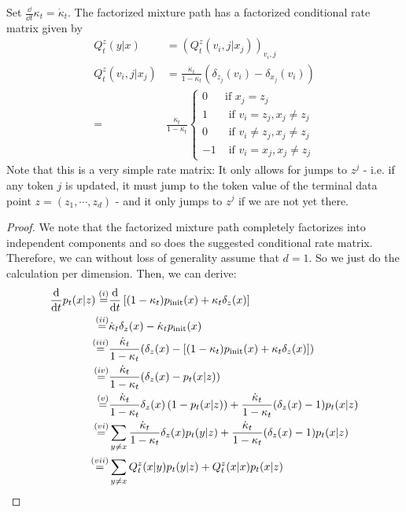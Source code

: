 \begin{examplebox}
\label{example:cond_rate_matrix_mixture_path}
Set $\frac{\dd}{\dd t}\kappa_t=\dot{\kappa}_t$. The factorized mixture path has a factorized conditional rate matrix given by
\begin{align*}
Q_t^z(y|x)&=(Q_t^z(v_i,j|x_j))_{v_i,j}\\
Q_t^z(v_i,j|x_j)&=\frac{\dot{\kappa}_t}{1-\kappa_t}(\delta_{z_j}(v_i)-\delta_{x_j}(v_i))\\
=&\frac{\dot{\kappa}_t}{1-\kappa_t}\begin{cases}
    0 & \text{if }x_j=z_j\\
    1 & \text{ if }v_i=z_j, x_j\neq z_j\\
    0 & \text{ if }v_i\neq z_j, x_j\neq z_j\\
    -1 & \text{ if }v_i=x_j, x_j\neq z_j
\end{cases}
\end{align*}
Note that this is a very simple rate matrix: It only allows for jumps to $z^j$ - i.e. if any token $j$ is updated, it must jump to the token value of the terminal data point $z=(z_1,\cdots,z_d)$ - and it only jumps to $z^j$ if we are not yet there.
\begin{proof}
We note that the factorized mixture path completely factorizes into independent components and so does the suggested conditional rate matrix. Therefore, we can without loss of generality assume that $d=1$. So we just do the calculation per dimension. Then, we can derive:
\begin{align*}
\frac{\dd}{\dd t}p_t(x|z)
\overset{(i)}{=}&\frac{\dd}{\dd t}\left[(1-\kappa_t)\pinit(x)+\kappa_t\delta_{z}(x)\right]\\
\overset{(ii)}{=}&\dot{\kappa}_t\delta_{z}(x)-\dot{\kappa}_t\pinit(x)\\
\overset{(iii)}{=}&\frac{\dot{\kappa}_t}{1-\kappa_t}(\delta_{z}(x)-[(1-\kappa_t)\pinit(x)+\kappa_t\delta_{z}(x)])\\
\overset{(iv)}{=}&\frac{\dot{\kappa}_t}{1-\kappa_t}(\delta_{z}(x)-p_t(x|z))\\
\overset{(v)}{=}&\frac{\dot{\kappa}_t}{1-\kappa_t}\delta_{z}(x)\left(
1-p_t(x|z)
\right)+\frac{\dot{\kappa}_t}{1-\kappa_t}(\delta_{z}(x)-1)p_t(x|z)\\
\overset{(vi)}{=}&\sum\limits_{y\neq x}\frac{\dot{\kappa}_t}{1-\kappa_t}\delta_{z}(x)p_t(y|z)
+\frac{\dot{\kappa}_t}{1-\kappa_t}(\delta_{z}(x)-1)p_t(x|z)\\
\overset{(vii)}{=}&\sum\limits_{y\neq x}Q_t^z(x|y)p_t(y|z)+Q_t^z(x|x)p_t(x|z)\\

\end{align*}
\end{proof}
\end{examplebox}
